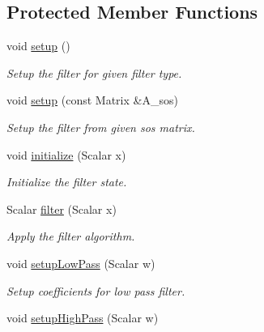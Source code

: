 \subsection*{Protected Member Functions}
\begin{DoxyCompactItemize}
\item 
void \hyperlink{classow__core_1_1ScalarButterWorthFilter_a22ec8fb68e3fb45d6b822f9298148b71}{setup} ()
\begin{DoxyCompactList}\small\item\em Setup the filter for given filter type. \end{DoxyCompactList}\item 
void \hyperlink{classow__core_1_1ScalarButterWorthFilter_a42cbe4415563060fc60462696dbec6c1}{setup} (const Matrix \&A\+\_\+sos)
\begin{DoxyCompactList}\small\item\em Setup the filter from given sos matrix. \end{DoxyCompactList}\item 
void \hyperlink{classow__core_1_1ScalarButterWorthFilter_aabd576ed87d76e04c9b1c8f282aa25f7}{initialize} (Scalar x)
\begin{DoxyCompactList}\small\item\em Initialize the filter state. \end{DoxyCompactList}\item 
Scalar \hyperlink{classow__core_1_1ScalarButterWorthFilter_a72d55ecc091b2304ee69eef567ecfbc9}{filter} (Scalar x)
\begin{DoxyCompactList}\small\item\em Apply the filter algorithm. \end{DoxyCompactList}\item 
void \hyperlink{classow__core_1_1ScalarButterWorthFilter_a93aaa07d135aed5e628535312dfacd33}{setup\+Low\+Pass} (Scalar w)\hypertarget{classow__core_1_1ScalarButterWorthFilter_a93aaa07d135aed5e628535312dfacd33}{}\label{classow__core_1_1ScalarButterWorthFilter_a93aaa07d135aed5e628535312dfacd33}

\begin{DoxyCompactList}\small\item\em Setup coefficients for low pass filter. \end{DoxyCompactList}\item 
void \hyperlink{classow__core_1_1ScalarButterWorthFilter_ab4a330a4d30843488793144d68adf61c}{setup\+High\+Pass} (Scalar w)\hypertarget{classow__core_1_1ScalarButterWorthFilter_ab4a330a4d30843488793144d68adf61c}{}\label{classow__core_1_1ScalarButterWorthFilter_ab4a330a4d30843488793144d68adf61c}


\end{DoxyCompactItemize}
